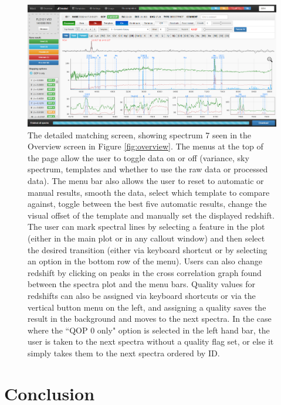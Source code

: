 \documentclass[iop]{emulateapj}
\begin{document}
\begin{figure}[H]
\centering
\includegraphics[width=\textwidth]{InterfaceZ2.png}
\caption{The detailed matching screen, showing spectrum 7 seen in the Overview screen in Figure \ref{fig:overview}. The menus at the top of the page allow the user to toggle data on or off (variance, sky spectrum, templates and whether to use the raw data or processed data). The menu bar also allows the user to reset to automatic or manual results, smooth the data, select which template to compare against, toggle between the best five automatic results, change the visual offset of the template and manually set the displayed redshift. The user can mark spectral lines by selecting a feature in the plot (either in the main plot or in any callout window) and then select the desired transition (either via keyboard shortcut or by selecting an option in the bottom row of the menu). Users can also change redshift by clicking on peaks in the cross correlation graph found between the spectra plot and the menu bars. Quality values for redshifts can also be assigned via keyboard shortcuts or via the vertical button menu on the left, and assigning a quality saves the result in the background and moves to the next spectra. In the case where the ``QOP 0 only" option is selected in the left hand bar, the user is taken to the next spectra without a quality flag set, or else it simply takes them to the next spectra ordered by ID.}
\label{fig:detailed}
\end{figure}












\section{Conclusion}
\end{document}
